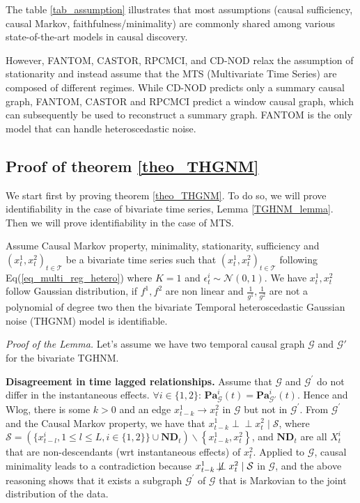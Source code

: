 The table \ref{tab_assumption} illustrates that most assumptions (causal sufficiency, causal Markov, faithfulness/minimality) are commonly shared among various state-of-the-art models in causal discovery.

However, FANTOM, CASTOR, RPCMCI, and CD-NOD relax the assumption of stationarity and instead assume that the MTS (Multivariate Time Series) are composed of different regimes. While CD-NOD predicts only a summary causal graph, FANTOM, CASTOR and RPCMCI predict a window causal graph, which can subsequently be used to reconstruct a summary graph. FANTOM is the only model that can handle heteroscedastic noise.
\subsection{Proof of theorem \ref{theo_THGNM}}
We start first by proving theorem \ref{theo_THGNM}. To do so, we will prove identifiability in the case of bivariate time series, Lemma \ref{TGHNM_lemma}. Then we will prove identifiability in the case of MTS.
\begin{mybox}\begin{lemma}
Assume Causal Markov property, minimality, stationarity, sufficiency and $(x^1_t,x^2_t)_{t \in \mathcal{T}}$ be a bivariate time series such that $(x^1_t,x^2_t)_{t \in \mathcal{T}}$ following Eq(\ref{eq_multi_reg_hetero}) where $K=1$ and $\epsilon^i_t \sim \mathcal{N}(0,1)$. We have $x^1_t,x^2_t$ follow Gaussian distribution, if $f^1,f^2$ are non linear and $\frac{1}{g^1},\frac{1}{g^2}$ are not a polynomial of degree two then the bivariate Temporal heteroscedastic Gaussian noise (THGNM) model is identifiable.
\label{TGHNM_lemma}
\end{lemma}  
\end{mybox}
\textit{Proof of the Lemma. }Let's assume we have two temporal causal graph $\mathcal{G}$ and $ \mathcal{G}'$ for the bivariate TGHNM. 

\textbf{Disagreement in time lagged relationships. } Assume that $\mathcal{G}$ and $\mathcal{G}^{\prime}$ do not differ in the instantaneous effects. $\forall i \in \{1,2\}$: $\mathbf{P a}_{\mathcal{G}}^i(t) = \mathbf{P a}_{\mathcal{G}'}^i(t)$. 
Hence and Wlog, there is some $k>0$ and an edge $x_{t-k}^1 \rightarrow x_t^2$ in $\mathcal{G}$ but not in $\mathcal{G}^{\prime}$. From $\mathcal{G}^{\prime}$ and the Causal Markov property, we have that $x_{t-k}^1 \perp\!\!\!\perp x_t^2 \mid \mathcal{S}$, where $\mathcal{S}=(\{x_{t-l}^i, 1 \leq l \leq L,  i \in \{1,2\}\} \cup \mathbf{N D}_t) \backslash\left\{x_{t-k}^1, x_t^2\right\}$, and $\mathbf{N D}_t$ are all $X_t^i$ that are non-descendants (wrt instantaneous effects) of $x_t^2$. Applied to $\mathcal{G}$, causal minimality leads to a contradiction because $x_{t-k}^1 \not\!\perp\!\!\!\perp x_t^2 \mid \mathcal{S}$ in $\mathcal{G}$, and the above reasoning shows that it exists a subgraph $\mathcal{G}^{\prime}$ of $\mathcal{G}$ that is Markovian to the joint distribution of the data.

